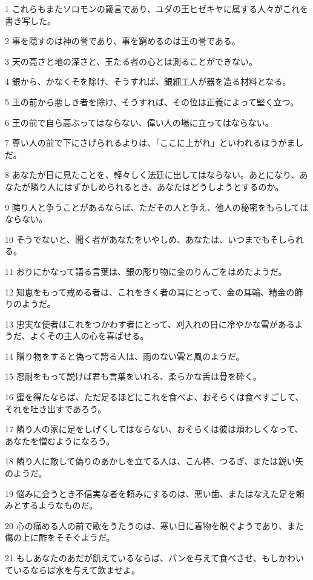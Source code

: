 \par 1 これらもまたソロモンの箴言であり、ユダの王ヒゼキヤに属する人々がこれを書き写した。
\par 2 事を隠すのは神の誉であり、事を窮めるのは王の誉である。
\par 3 天の高さと地の深さと、王たる者の心とは測ることができない。
\par 4 銀から、かなくそを除け、そうすれば、銀細工人が器を造る材料となる。
\par 5 王の前から悪しき者を除け、そうすれば、その位は正義によって堅く立つ。
\par 6 王の前で自ら高ぶってはならない、偉い人の場に立ってはならない。
\par 7 尊い人の前で下にさげられるよりは、「ここに上がれ」といわれるほうがましだ。
\par 8 あなたが目に見たことを、軽々しく法廷に出してはならない。あとになり、あなたが隣り人にはずかしめられるとき、あなたはどうしようとするのか。
\par 9 隣り人と争うことがあるならば、ただその人と争え、他人の秘密をもらしてはならない。
\par 10 そうでないと、聞く者があなたをいやしめ、あなたは、いつまでもそしられる。
\par 11 おりにかなって語る言葉は、銀の彫り物に金のりんごをはめたようだ。
\par 12 知恵をもって戒める者は、これをきく者の耳にとって、金の耳輪、精金の飾りのようだ。
\par 13 忠実な使者はこれをつかわす者にとって、刈入れの日に冷やかな雪があるようだ、よくその主人の心を喜ばせる。
\par 14 贈り物をすると偽って誇る人は、雨のない雲と風のようだ。
\par 15 忍耐をもって説けば君も言葉をいれる、柔らかな舌は骨を砕く。
\par 16 蜜を得たならば、ただ足るほどにこれを食べよ、おそらくは食べすごして、それを吐き出すであろう。
\par 17 隣り人の家に足をしげくしてはならない、おそらくは彼は煩わしくなって、あなたを憎むようになろう。
\par 18 隣り人に敵して偽りのあかしを立てる人は、こん棒、つるぎ、または鋭い矢のようだ。
\par 19 悩みに会うとき不信実な者を頼みにするのは、悪い歯、またはなえた足を頼みとするようなものだ。
\par 20 心の痛める人の前で歌をうたうのは、寒い日に着物を脱ぐようであり、また傷の上に酢をそそぐようだ。
\par 21 もしあなたのあだが飢えているならば、パンを与えて食べさせ、もしかわいているならば水を与えて飲ませよ。

